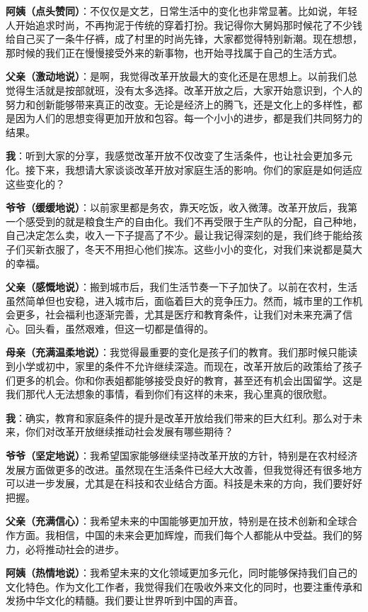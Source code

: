 \documentclass[12pt,a4paper]{article}%
\begin{document}
\textbf{阿姨（点头赞同）}：不仅仅是文艺，日常生活中的变化也非常显著。比如说，年轻人开始追求时尚，不再拘泥于传统的穿着打扮。我记得你大舅妈那时候花了不少钱给自己买了一条牛仔裤，成了村里的时尚先锋，大家都觉得特别新潮。现在想想，那时候的我们正在慢慢接受外来的新事物，也开始寻找属于自己的生活方式。

\textbf{父亲（激动地说）}：是啊，我觉得改革开放最大的变化还是在思想上。以前我们总觉得生活就是按部就班，没有太多选择。改革开放之后，大家开始意识到，个人的努力和创新能够带来真正的改变。无论是经济上的腾飞，还是文化上的多样性，都是因为人们的思想变得更加开放和包容。每一个小小的进步，都是我们共同努力的结果。

\textbf{我}：听到大家的分享，我感觉改革开放不仅改变了生活条件，也让社会更加多元化。接下来，我想请大家谈谈改革开放对家庭生活的影响。你们的家庭是如何适应这些变化的？

\textbf{爷爷（缓缓地说）}：以前家里都是务农，靠天吃饭，收入微薄。改革开放后，我第一个感受到的就是粮食生产的自由化。我们不再受限于生产队的分配，自己种地，自己决定怎么卖，收入一下子提高了不少。最让我记得深刻的是，我们终于能给孩子们买新衣服了，冬天不用担心他们挨冻。这些小小的变化，对我们来说都是莫大的幸福。

\textbf{父亲（感慨地说）}：搬到城市后，我们生活节奏一下子加快了。以前在农村，生活虽然简单但也安稳，进入城市后，面临着巨大的竞争压力。然而，城市里的工作机会更多，社会福利也逐渐完善，尤其是医疗和教育条件，让我们对未来充满了信心。回头看，虽然艰难，但这一切都是值得的。

\textbf{母亲（充满温柔地说）}：我觉得最重要的变化是孩子们的教育。我们那时候只能读到小学或初中，家里的条件不允许继续深造。而现在，改革开放后的政策给了孩子们更多的机会。你和你表姐都能够接受良好的教育，甚至还有机会出国留学。这是我们那代人无法想象的事情，看到你们有这样的未来，我心里真的很欣慰。

\textbf{我}：确实，教育和家庭条件的提升是改革开放给我们带来的巨大红利。那么对于未来，你们对改革开放继续推动社会发展有哪些期待？

\textbf{爷爷（坚定地说）}：我希望国家能够继续坚持改革开放的方针，特别是在农村经济发展方面做更多的改进。虽然现在生活条件已经大大改善，但我觉得还有很多地方可以进一步发展，尤其是在科技和农业结合方面。科技是未来的方向，我们要好好把握。

\textbf{父亲（充满信心）}：我希望未来的中国能够更加开放，特别是在技术创新和全球合作方面。我相信，中国的未来会更加辉煌，而我们每个人都能从中受益。我们的努力，必将推动社会的进步。

\textbf{阿姨（热情地说）}：我希望未来的文化领域更加多元化，同时能够保持我们自己的文化特色。作为文化工作者，我觉得我们在吸收外来文化的同时，也要注重传承和发扬中华文化的精髓。我们要让世界听到中国的声音。
\end{document}
